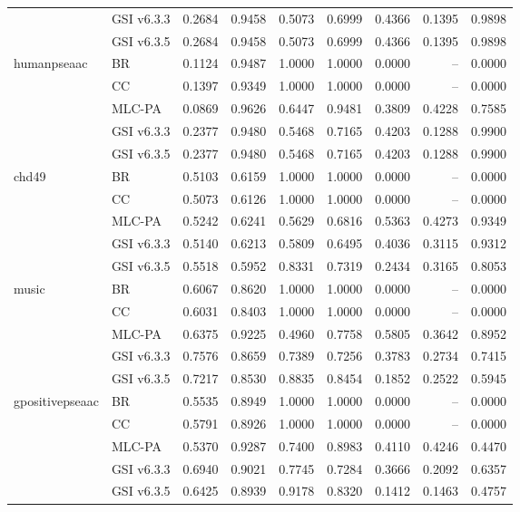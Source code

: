 \documentclass[11pt,a4paper,twoside]{article}
\begin{document}
\begin{landscape}
\begin{longtable}{llrrrrrrr}
 & GSI v6.3.3 & 0.2684 & 0.9458 & 0.5073 & 0.6999 & 0.4366 & 0.1395 & 0.9898 \\
 & GSI v6.3.5 & 0.2684 & 0.9458 & 0.5073 & 0.6999 & 0.4366 & 0.1395 & 0.9898 \\
\addlinespace[2pt]
humanpseaac & BR & 0.1124 & 0.9487 & 1.0000 & 1.0000 & 0.0000 & -- & 0.0000 \\
 & CC & 0.1397 & 0.9349 & 1.0000 & 1.0000 & 0.0000 & -- & 0.0000 \\
 & MLC-PA & 0.0869 & 0.9626 & 0.6447 & 0.9481 & 0.3809 & 0.4228 & 0.7585 \\
 & GSI v6.3.3 & 0.2377 & 0.9480 & 0.5468 & 0.7165 & 0.4203 & 0.1288 & 0.9900 \\
 & GSI v6.3.5 & 0.2377 & 0.9480 & 0.5468 & 0.7165 & 0.4203 & 0.1288 & 0.9900 \\
\addlinespace[2pt]
chd49 & BR & 0.5103 & 0.6159 & 1.0000 & 1.0000 & 0.0000 & -- & 0.0000 \\
 & CC & 0.5073 & 0.6126 & 1.0000 & 1.0000 & 0.0000 & -- & 0.0000 \\
 & MLC-PA & 0.5242 & 0.6241 & 0.5629 & 0.6816 & 0.5363 & 0.4273 & 0.9349 \\
 & GSI v6.3.3 & 0.5140 & 0.6213 & 0.5809 & 0.6495 & 0.4036 & 0.3115 & 0.9312 \\
 & GSI v6.3.5 & 0.5518 & 0.5952 & 0.8331 & 0.7319 & 0.2434 & 0.3165 & 0.8053 \\
\addlinespace[2pt]
music & BR & 0.6067 & 0.8620 & 1.0000 & 1.0000 & 0.0000 & -- & 0.0000 \\
 & CC & 0.6031 & 0.8403 & 1.0000 & 1.0000 & 0.0000 & -- & 0.0000 \\
 & MLC-PA & 0.6375 & 0.9225 & 0.4960 & 0.7758 & 0.5805 & 0.3642 & 0.8952 \\
 & GSI v6.3.3 & 0.7576 & 0.8659 & 0.7389 & 0.7256 & 0.3783 & 0.2734 & 0.7415 \\
 & GSI v6.3.5 & 0.7217 & 0.8530 & 0.8835 & 0.8454 & 0.1852 & 0.2522 & 0.5945 \\
\addlinespace[2pt]
gpositivepseaac & BR & 0.5535 & 0.8949 & 1.0000 & 1.0000 & 0.0000 & -- & 0.0000 \\
 & CC & 0.5791 & 0.8926 & 1.0000 & 1.0000 & 0.0000 & -- & 0.0000 \\
 & MLC-PA & 0.5370 & 0.9287 & 0.7400 & 0.8983 & 0.4110 & 0.4246 & 0.4470 \\
 & GSI v6.3.3 & 0.6940 & 0.9021 & 0.7745 & 0.7284 & 0.3666 & 0.2092 & 0.6357 \\
 & GSI v6.3.5 & 0.6425 & 0.8939 & 0.9178 & 0.8320 & 0.1412 & 0.1463 & 0.4757 \\

\end{longtable}
\end{landscape}
\end{document}
